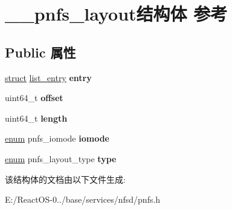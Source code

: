 \hypertarget{struct____pnfs__layout}{}\section{\+\_\+\+\_\+pnfs\+\_\+layout结构体 参考}
\label{struct____pnfs__layout}
\subsection*{Public 属性}
\begin{DoxyCompactItemize}
\item 
\mbox{\label{struct____pnfs__layout_ac6496f8cb09bb6431b6942f5f947a9df}} 
\hyperlink{interfacestruct}{struct} \hyperlink{structlist__entry}{list\+\_\+entry} {\bfseries entry}
\item 
\mbox{\label{struct____pnfs__layout_a683381a1b4f51b9dd5f868a8776c5eea}} 
uint64\+\_\+t {\bfseries offset}
\item 
\mbox{\label{struct____pnfs__layout_ab6348e58157ce84d3d1ed01dacfad739}} 
uint64\+\_\+t {\bfseries length}
\item 
\mbox{\label{struct____pnfs__layout_ab3a7b818fee3460b20593c08d3e4f57d}} 
\hyperlink{interfaceenum}{enum} pnfs\+\_\+iomode {\bfseries iomode}
\item 
\mbox{\label{struct____pnfs__layout_aad4f588742839a932a497bb8286cc3db}} 
\hyperlink{interfaceenum}{enum} pnfs\+\_\+layout\+\_\+type {\bfseries type}
\end{DoxyCompactItemize}


该结构体的文档由以下文件生成\+:\begin{DoxyCompactItemize}
\item 
E\+:/\+React\+O\+S-\/0../base/services/nfsd/pnfs.\+h\end{DoxyCompactItemize}

